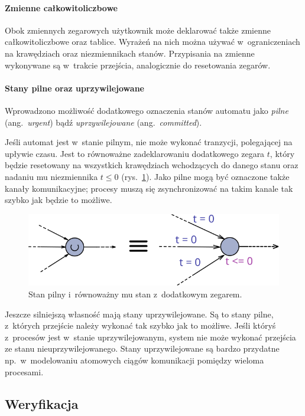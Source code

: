 \documentclass{pracamgr}
\newcommand{\ang}[1]{(ang.~\emph{#1})}
\newcommand{\imgr}[1]{rys.~\ref{#1}}
\theoremstyle{plain}
\begin{document}
\paragraph{Zmienne całkowitoliczbowe} Obok zmiennych zegarowych
użytkownik może deklarować także zmienne całkowitoliczbowe oraz
tablice. Wyrażeń na nich można używać w~ograniczeniach na krawędziach
oraz niezmiennikach stanów. Przypisania na zmienne wykonywane są
w~trakcie przejścia, analogicznie do resetowania zegarów.

\paragraph{Stany pilne oraz uprzywilejowane} Wprowadzono możliwość
dodatkowego oznaczenia stanów automatu jako \emph{pilne}
\ang{urgent} bądź \emph{uprzywilejowane} \ang{committed}.

Jeśli automat jest w~stanie pilnym, nie może wykonać tranzycji,
polegającej na upływie czasu. Jest to równoważne zadeklarowaniu
dodatkowego zegara $t$, który będzie resetowany na wszystkich
krawędziach wchodzących do danego stanu oraz nadaniu mu
niezmiennika $t \leq 0$ (\imgr{img:uppaal-urgent}). Jako pilne mogą
być oznaczone także kanały komunikacyjne; procesy muszą się
zsynchronizować na takim kanale tak szybko jak będzie to możliwe.

\begin{figure}[h]
  \centering
  \includegraphics[width=.5\textwidth]{img/uppaal-urgent}
  \caption{Stan pilny i~równoważny mu stan z~dodatkowym
    zegarem.}
  \label{img:uppaal-urgent}
\end{figure}

Jeszcze silniejszą własność mają stany uprzywilejowane. Są to stany
pilne, z~których przejście należy wykonać tak szybko jak to
możliwe. Jeśli któryś z~procesów jest w~stanie uprzywilejowanym,
system nie może wykonać przejścia ze stanu nieuprzywilejowanego.
Stany uprzywilejowane są bardzo przydatne np.~w~modelowaniu atomowych
ciągów komunikacji pomiędzy wieloma procesami.

\subsection{Weryfikacja}
\end{document}
